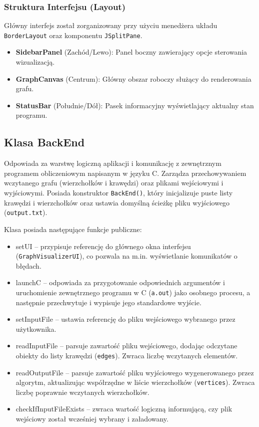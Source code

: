 \documentclass[]{article}
\begin{document}
    \subsubsection{Struktura Interfejsu (Layout)}
    Główny interfejs został zorganizowany przy użyciu menedżera układu \texttt{BorderLayout} oraz komponentu \texttt{JSplitPane}.
    \begin{itemize}
    \item \textbf{SidebarPanel} (Zachód/Lewo): Panel boczny zawierający opcje sterowania wizualizacją.
    \item \textbf{GraphCanvas} (Centrum): Główny obszar roboczy służący do renderowania grafu.
    \item \textbf{StatusBar} (Południe/Dół): Pasek informacyjny wyświetlający aktualny stan programu.
    \end{itemize}

    \subsection{Klasa BackEnd}
    Odpowiada za warstwę logiczną aplikacji i komunikację z zewnętrznym programem obliczeniowym napisanym w języku C. Zarządza przechowywaniem wczytanego grafu (wierzchołków i krawędzi) oraz plikami wejściowymi i wyjściowymi.
    Posiada konstruktor \texttt{BackEnd()}, który inicjalizuje puste listy krawędzi i wierzchołków oraz ustawia domyślną ścieżkę pliku wyjściowego (\texttt{output.txt}).
    
    Klasa posiada następujące funkcje publiczne:
    \begin{itemize}
        \item setUI -- przypisuje referencję do głównego okna interfejsu (\texttt{GraphVisualizerUI}), co pozwala na m.in. wyświetlanie komunikatów o błędach.
        \item launchC -- odpowiada za przygotowanie odpowiednich argumentów i uruchomienie zewnętrznego programu w C (\texttt{a.out}) jako osobnego procesu, a następnie przechwytuje i wypisuje jego standardowe wyjście.
        \item setInputFile -- ustawia referencję do pliku wejściowego wybranego przez użytkownika.
        \item readInputFile -- parsuje zawartość pliku wejściowego, dodając odczytane obiekty do listy krawędzi (\texttt{edges}). Zwraca liczbę wczytanych elementów.
        \item readOutputFile -- parsuje zawartość pliku wyjściowego wygenerowanego przez algorytm, aktualizując współrzędne w liście wierzchołków (\texttt{vertices}). Zwraca liczbę poprawnie wczytanych wierzchołków.
        \item checkIfInputFileExists -- zwraca wartość logiczną informującą, czy plik wejściowy został wcześniej wybrany i załadowany.
    \end{itemize}
\end{document}
